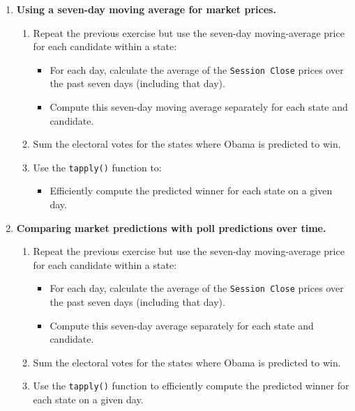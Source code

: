 \documentclass[12pt]{article}
\begin{document}
\begin{enumerate}
    \item \textbf{Using a seven-day moving average for market prices.}
    \begin{enumerate}[label=(\alph*)]
        \item Repeat the previous exercise but use the seven-day moving-average price for each candidate within a state:
        \begin{itemize}
            \item For each day, calculate the average of the \texttt{Session Close} prices over the past seven days (including that day).
            \item Compute this seven-day moving average separately for each state and candidate.
        \end{itemize}
        \item Sum the electoral votes for the states where Obama is predicted to win.
        \item Use the \texttt{tapply()} function to:
        \begin{itemize}
            \item Efficiently compute the predicted winner for each state on a given day.
        \end{itemize}
    \end{enumerate}

    \item \textbf{Comparing market predictions with poll predictions over time.}
    \begin{enumerate}[label=(\alph*)]
        \item Repeat the previous exercise but use the seven-day moving-average price for each candidate within a state:
        \begin{itemize}
            \item For each day, calculate the average of the \texttt{Session Close} prices over the past seven days (including that day).
            \item Compute this seven-day average separately for each state and candidate.
        \end{itemize}
        \item Sum the electoral votes for the states where Obama is predicted to win.
        \item Use the \texttt{tapply()} function to efficiently compute the predicted winner for each state on a given day.
    \end{enumerate}


\end{enumerate}
\end{document}

